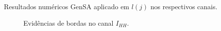 \documentclass[10pt]{beamer}
\begin{document}
\begin{frame}{Resultados numéricos}
\alert{GenSA aplicado em $l(j)$ nos respectivos canais.}
\begin{figure}[hbt]
\caption{Evidências de bordas no canal $I_{HH}$.}\label{cap_acf_fig07}
\endminipage\hfill
{}

\end{figure}
\end{frame}
\end{document}
